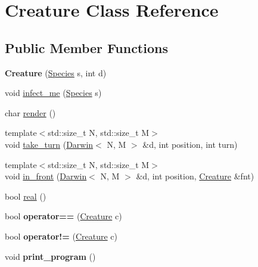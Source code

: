 \hypertarget{classCreature}{\section{Creature Class Reference}
\label{classCreature}
}
\subsection*{Public Member Functions}
\begin{DoxyCompactItemize}
\item 
\hypertarget{classCreature_a4f3236ca916953f3dedda46875a1386e}{{\bfseries Creature} (\hyperlink{classSpecies}{Species} s, int d)}\label{classCreature_a4f3236ca916953f3dedda46875a1386e}

\item 
void \hyperlink{classCreature_a71fcba906866260a1172036d7074c2c3}{infect\-\_\-me} (\hyperlink{classSpecies}{Species} s)
\item 
char \hyperlink{classCreature_abede6ea489d2f9731b88e08923733ea2}{render} ()
\item 
{\footnotesize template$<$std\-::size\-\_\-t N, std\-::size\-\_\-t M$>$ }\\void \hyperlink{classCreature_a858a868dd6b1e1bc529fe3a58451bbba}{take\-\_\-turn} (\hyperlink{classDarwin}{Darwin}$<$ N, M $>$ \&d, int position, int turn)
\item 
{\footnotesize template$<$std\-::size\-\_\-t N, std\-::size\-\_\-t M$>$ }\\void \hyperlink{classCreature_a597107fe6cc07e2bc31da65358eb5e45}{in\-\_\-front} (\hyperlink{classDarwin}{Darwin}$<$ N, M $>$ \&d, int position, \hyperlink{classCreature}{Creature} \&fnt)
\item 
bool \hyperlink{classCreature_aee075e42b38c6e82f8cb6ef652be4427}{real} ()
\item 
\hypertarget{classCreature_ab221cfcba3b7a44ec516bf57ef42a54c}{bool {\bfseries operator==} (\hyperlink{classCreature}{Creature} c)}\label{classCreature_ab221cfcba3b7a44ec516bf57ef42a54c}

\item 
\hypertarget{classCreature_acde8a07f27259e5a953fdeb68222f7f7}{bool {\bfseries operator!=} (\hyperlink{classCreature}{Creature} c)}\label{classCreature_acde8a07f27259e5a953fdeb68222f7f7}

\item 
\hypertarget{classCreature_a15c054611a8f6d5592a276e7640544e3}{void {\bfseries print\-\_\-program} ()}\label{classCreature_a15c054611a8f6d5592a276e7640544e3}

\end{DoxyCompactItemize}


